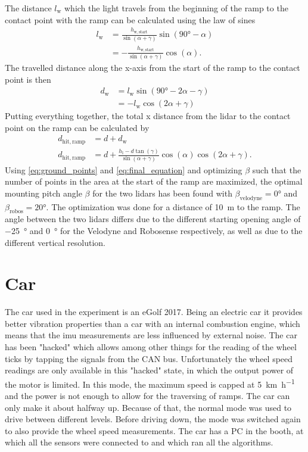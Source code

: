 The distance $l_\mathrm{w}$ which the light travels from the beginning of the ramp to the contact point with the ramp can be calculated using the law of sines
\begin{align}
	l_\mathrm{w} & = \frac{h_\mathrm{w,start} }{\sin(\alpha + \gamma)} \sin(\ang{90} - \alpha) \nonumber \\
	             & = -\frac{h_\mathrm{w,start} }{\sin(\alpha + \gamma)} \cos(\alpha).
\end{align}
The travelled distance along the x-axis from the start of the ramp to the contact point is then
\begin{align}
	d_\mathrm{w} & = l_\mathrm{w} \sin(\ang{90} - 2\alpha - \gamma) \nonumber \\
	             & = -l_\mathrm{w} \cos(2\alpha + \gamma)
\end{align}
Putting everything together, the total x distance from the \gls{lidar} to the contact point on the ramp can be calculated by
\begin{align}
	d_\mathrm{hit,ramp} & = d + d_\mathrm{w}                                                                                    \nonumber \\
	d_\mathrm{hit,ramp} & = d + \frac{h_\mathrm{l} - d\tan(\gamma)}{\sin(\alpha + \gamma)} \cos(\alpha) \cos(2\alpha + \gamma).
	\label{eq:final_equation}
\end{align}
Using \cref{eq:ground_points} and \cref{eq:final_equation} and optimizing $\beta$ such that the number of points in the area at the start of the ramp are maximized, the optimal mounting pitch angle $\beta$ for the two \gls{lidar}s has been found with $\beta_\mathrm{velodyne} = \ang{0}$ and $\beta_\mathrm{robos} = \ang{20}$.
The optimization was done for a distance of \SI{10}{\metre} to the ramp.
The angle between the two \gls{lidar}s differs due to the different starting opening angle of \SI{-25}{\degree} and \SI{0}{\degree} for the Velodyne and Robosense respectively, as well as due to the different vertical resolution.


\section{Car}
The car used in the experiment is an eGolf 2017.
Being an electric car it provides better vibration properties than a car with an internal combustion engine, which means that the \gls{imu} measurements are less influenced by external noise.
The car has been "hacked" which allows among other things for the reading of the wheel ticks by tapping the signals from the CAN bus.
Unfortunately the wheel speed readings are only available in this "hacked" state, in which the output power of the motor is limited.
In this mode, the maximum speed is capped at \SI{5}{\kilo\metre\per\hour} and the power is not enough to allow for the traversing of ramps.
The car can only make it about halfway up.
Because of that, the normal mode was used to drive between different levels.
Before driving down, the mode was switched again to also provide the wheel speed measurements.
The car has a PC in the booth, at which all the sensors were connected to and which ran all the algorithms.



